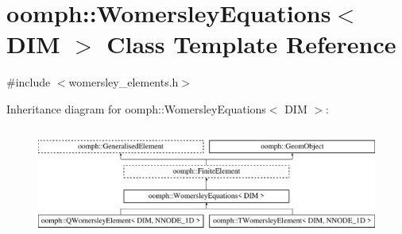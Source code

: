 \hypertarget{classoomph_1_1WomersleyEquations}{}\section{oomph\+:\+:Womersley\+Equations$<$ D\+IM $>$ Class Template Reference}
\label{classoomph_1_1WomersleyEquations}


{\ttfamily \#include $<$womersley\+\_\+elements.\+h$>$}

Inheritance diagram for oomph\+:\+:Womersley\+Equations$<$ D\+IM $>$\+:\begin{figure}[H]
\begin{center}
\leavevmode
\includegraphics[height=3.696370cm]{classoomph_1_1WomersleyEquations}
\end{center}
\end{figure}

